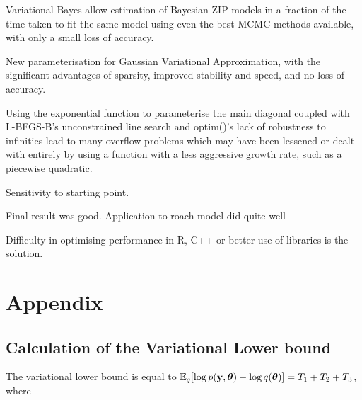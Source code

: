 \documentclass{article}[12pt]
\begin{document}
Variational Bayes allow estimation of Bayesian ZIP models in a fraction of the time taken to fit the same
model using even the best MCMC methods available, with only a small loss of accuracy.

New parameterisation for Gaussian Variational Approximation, with the significant advantages of sparsity,
improved stability and speed, and no loss of accuracy.

Using the exponential function to parameterise the main diagonal coupled with L-BFGS-B's unconstrained line
search and optim()'s lack of robustness to infinities lead to many overflow problems which may have been
lessened or dealt with entirely by using a function with a less aggressive growth rate, such as a piecewise
quadratic.

Sensitivity to starting point.

Final result was good. Application to roach model did quite well

Difficulty in optimising performance in R, C++ or better use of libraries is the solution.

\newpage
\section{Appendix} 
\subsection{Calculation of the Variational Lower bound}

The variational lower bound is equal to ${\mathbb E}_q[\log{p({\bf y}, {\boldsymbol\theta})} - \log{q({\boldsymbol\theta})}] = T_1 + T_2 + T_3$,
where
\end{document}
